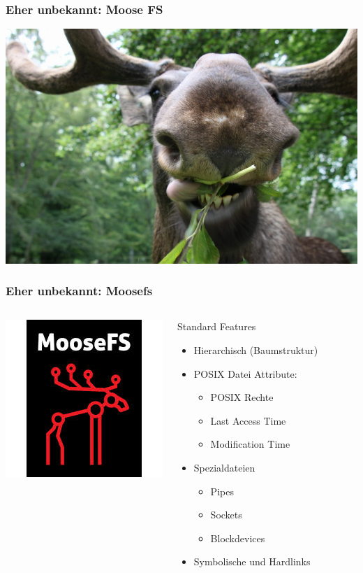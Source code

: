 \documentclass{beamer}
\begin{document}
\begin{frame}
	\frametitle{Eher unbekannt: Moose FS}
	\centering
	\includegraphics[scale=0.3]{elch1.jpg}
\end{frame}

\begin{frame}
	\frametitle{Eher unbekannt: Moosefs}
	\begin{columns}	
	\includegraphics[scale=0.5]{moosefs.jpg}
	\begin{block}{Standard Features}
		\begin{itemize}
			\item Hierarchisch (Baumstruktur)
			\item POSIX Datei Attribute:
			\begin{itemize}
				\item POSIX Rechte
				\item Last Access Time
				\item Modification Time 
			\end{itemize}	
			\item Spezialdateien
			\begin{itemize}
				\item Pipes
				\item Sockets
				\item Blockdevices
			\end{itemize}
			\item Symbolische und Hardlinks
		\end{itemize}
	\end{block}	
	\end{columns}
\end{frame}
\end{document}
